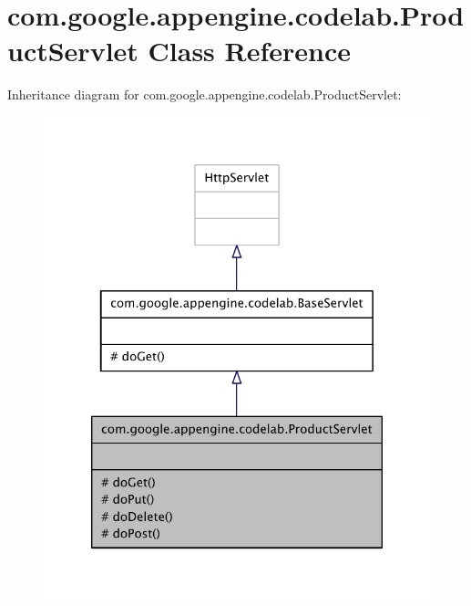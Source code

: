 \hypertarget{classcom_1_1google_1_1appengine_1_1codelab_1_1_product_servlet}{\section{com.\-google.\-appengine.\-codelab.\-Product\-Servlet Class Reference}
\label{classcom_1_1google_1_1appengine_1_1codelab_1_1_product_servlet}
}


Inheritance diagram for com.\-google.\-appengine.\-codelab.\-Product\-Servlet\-:
\nopagebreak
\begin{figure}[H]
\begin{center}
\leavevmode
\includegraphics[width=320pt]{classcom_1_1google_1_1appengine_1_1codelab_1_1_product_servlet__inherit__graph}
\end{center}
\end{figure}


